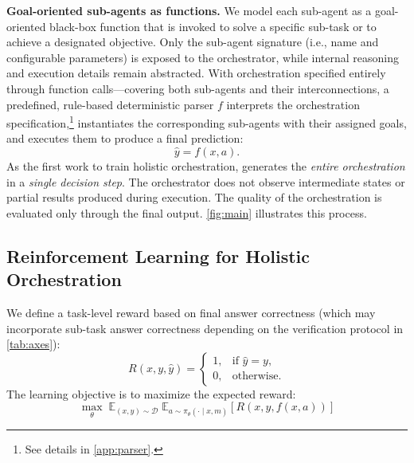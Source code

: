 \textbf{Goal-oriented sub-agents as functions.}
We model each sub-agent as a goal-oriented black-box function that is invoked to
solve a specific sub-task or {to} achieve a designated objective. Only the sub-agent
signature (i.e., name and configurable parameters) is exposed to the
orchestrator, while internal reasoning and execution details remain abstracted. {With orchestration specified entirely through function calls—covering both sub-agents and their interconnections, a} predefined, rule-based deterministic {parser} $f$ interprets the orchestration specification,\footnote{See details in
\cref{app:parser}.} instantiates the
corresponding sub-agents with their assigned goals, and executes them to
produce a final prediction:
\begin{equation}
\hat{y} = f(x, a).
\end{equation}
As the first work to train holistic orchestration, \ourframework generates the
\emph{entire orchestration} in a \emph{single decision step}. The orchestrator does not observe intermediate states or partial results produced during execution. The quality of the orchestration is evaluated only through the final output. %
\cref{fig:main} illustrates this process.
\subsection{Reinforcement Learning for Holistic Orchestration}

We define a task-level reward based on {final answer correctness (which may incorporate sub-task answer correctness depending on the verification protocol in \cref{tab:axes})}: 
\begin{equation}
R(x, y, \hat{y}) =
\begin{cases}
1, & \text{if } \hat{y} = y, \\
0, & \text{otherwise}.
\end{cases}
\end{equation}
The learning objective is to maximize the expected reward:
\begin{equation}
\label{eq:general_objetive}
\max_{\theta} \;
\mathbb{E}_{(x,y) \sim \mathcal{D}} \;
\mathbb{E}_{a \sim \pi_\theta(\cdot \mid x, m)}
\left[ R(x, y, f(x,a)) \right]
\end{equation}


